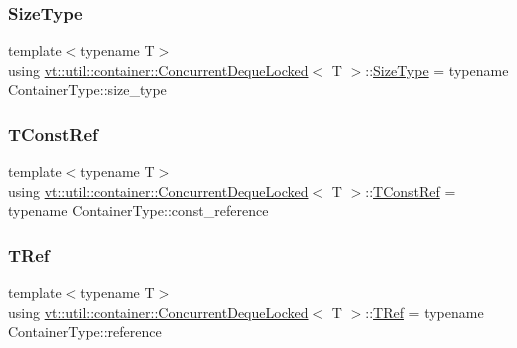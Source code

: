 \subsubsection{\texorpdfstring{Size\+Type}{SizeType}}
{\footnotesize\ttfamily template$<$typename T$>$ \\
using \hyperlink{structvt_1_1util_1_1container_1_1_concurrent_deque_locked}{vt\+::util\+::container\+::\+Concurrent\+Deque\+Locked}$<$ T $>$\+::\hyperlink{structvt_1_1util_1_1container_1_1_concurrent_deque_locked_a6f35f4923f1329d25378656b0582e916}{Size\+Type} =  typename Container\+Type\+::size\+\_\+type}

\mbox{\label{structvt_1_1util_1_1container_1_1_concurrent_deque_locked_a9da9776dff836c013a95431f3ab15e35}} 
\subsubsection{\texorpdfstring{T\+Const\+Ref}{TConstRef}}
{\footnotesize\ttfamily template$<$typename T$>$ \\
using \hyperlink{structvt_1_1util_1_1container_1_1_concurrent_deque_locked}{vt\+::util\+::container\+::\+Concurrent\+Deque\+Locked}$<$ T $>$\+::\hyperlink{structvt_1_1util_1_1container_1_1_concurrent_deque_locked_a9da9776dff836c013a95431f3ab15e35}{T\+Const\+Ref} =  typename Container\+Type\+::const\+\_\+reference}

\mbox{\label{structvt_1_1util_1_1container_1_1_concurrent_deque_locked_a4451b0e7f6c8aa741f98a77a9fed353e}} 
\subsubsection{\texorpdfstring{T\+Ref}{TRef}}
{\footnotesize\ttfamily template$<$typename T$>$ \\
using \hyperlink{structvt_1_1util_1_1container_1_1_concurrent_deque_locked}{vt\+::util\+::container\+::\+Concurrent\+Deque\+Locked}$<$ T $>$\+::\hyperlink{structvt_1_1util_1_1container_1_1_concurrent_deque_locked_a4451b0e7f6c8aa741f98a77a9fed353e}{T\+Ref} =  typename Container\+Type\+::reference}



